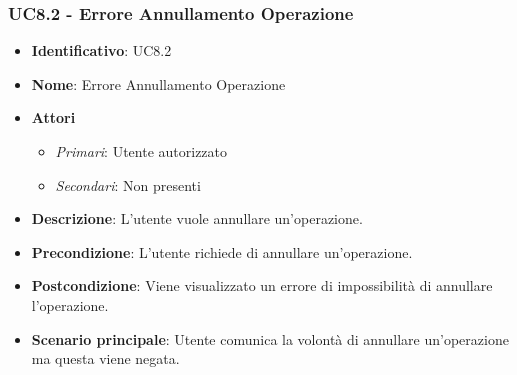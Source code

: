 \subsubsection{UC8.2 - Errore Annullamento Operazione}
\begin{itemize}
	\item \textbf{Identificativo}: UC8.2
	\item \textbf{Nome}: Errore Annullamento Operazione 
	\item \textbf{Attori}
	\begin{itemize} 
		\item \textit{Primari}: Utente autorizzato
		\item \textit{Secondari}: Non presenti
	\end{itemize}
	\item \textbf{Descrizione}: L'utente vuole annullare un'operazione.
	\item \textbf{Precondizione}: L'utente richiede di annullare un'operazione.
	\item \textbf{Postcondizione}: Viene visualizzato un errore di impossibilità di annullare l'operazione.
	\item \textbf{Scenario principale}: Utente comunica la volontà di annullare un'operazione ma questa viene negata.
\end{itemize}
\newpage